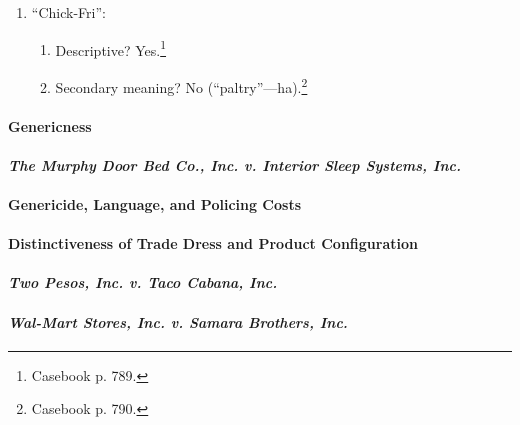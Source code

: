 \begin{enumerate}
\begin{enumerate}
\begin{enumerate}
            descriptive sense of ``fish fry.'' So, its competitors are free to 
            use them in that sense.\footnote{Casebook p. 789.}
            \item Also, dissimilar trade dress would likely prevent consumer 
            confusion.
        \end{enumerate}
    \end{enumerate}
    \item ``Chick-Fri'':
    \begin{enumerate}
        \item Descriptive? Yes.\footnote{Casebook p. 789.}
        \item Secondary meaning? No (``paltry''---ha).\footnote{Casebook p. 
        790.}
    \end{enumerate}
\end{enumerate}

\newpage %

\paragraph{Genericness}


\paragraph{\emph{The Murphy Door Bed Co., Inc. v. Interior Sleep Systems, Inc.}}


\paragraph{Genericide, Language, and Policing Costs}


\paragraph{Distinctiveness of Trade Dress and Product Configuration}


\paragraph{\emph{Two Pesos, Inc. v. Taco Cabana, Inc.}}


\paragraph{\emph{Wal-Mart Stores, Inc. v. Samara Brothers, Inc.}}

